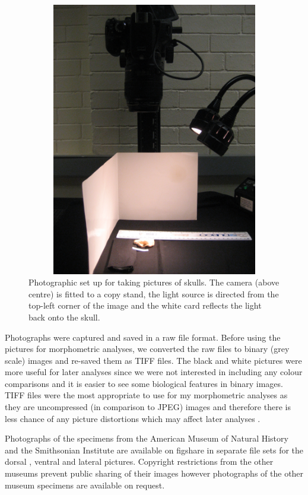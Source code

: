 \documentclass[12pt,a4paper]{article}
\begin{document}
	\begin{figure}[H] 
  	\centering
  	\includegraphics[width=12cm, height=12cm, keepaspectratio=true]{figures/camera.jpg}
    \caption[Photographic set up]%
    {Photographic set up for taking pictures of skulls. The camera (above centre) is fitted to a copy stand, the light source is directed from the top-left corner of the image and the white card reflects the light back onto the skull. }%
  	\label{fig:camera}
  	\end{figure}

Photographs were captured and saved in a raw file format. Before using the pictures for morphometric analyses, we converted the raw files to binary (grey scale) images and re-saved them as TIFF files. The black and white pictures were more useful for later analyses since we were not interested in including any colour comparisons and it is easier to see some biological features in binary images. TIFF files were the most appropriate to use for my morphometric analyses as they are uncompressed (in comparison to JPEG) images and therefore there is less chance of any picture distortions which may affect later analyses \citep{HERC2013}.

Photographs of the specimens from the American Museum of Natural History and the Smithsonian Institute are available on figshare in separate file sets for the dorsal \citep{Finlay2013}, ventral \citep{Finlay2013v} and lateral \citep{Finlay2013l} pictures. Copyright restrictions from the other museums prevent public sharing of their images however photographs of the other museum specimens are available on request.
\end{document}
